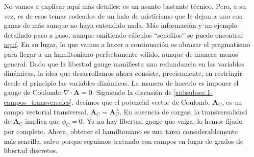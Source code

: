 No vamos a explicar aquí más detalles; es un asunto bastante técnico. Pero, a su vez, es de esos temas rodeados de un halo de misticismo que le dejan a uno con ganas de más aunque no haya entendido nada. Más información y un ejemplo detallado paso a paso, aunque omitiendo cálculos ``sencillos'' se puede encontrar \href{https://arxiv.org/abs/2201.06558}{aquí}. En su lugar, lo que vamos a hacer a continuación es abrazar el pragmatismo para llegar a un hamiltoniano perfectamente válido, aunque de manera menos general. Dado que la libertad gauge manifiesta una redundancia en las variables dinámicas, la idea que desarrollamos ahora consiste, precisamente, en restringir desde el principio las variables dinámicas. La manera de hacerlo es imponer el gauge de Coulomb: \(\nabla\cdot\mathbf{A} = 0\). Siguiendo la discusión de \cref{subsubsec.1-campos_transversales}, decimos que el potencial vector de Coulomb, \(\mathbf{A}_\mathrm{C}\), es un campo vectorial transversal, \(\mathbf{A}_\mathrm{C} = \mathbf{A}_\mathrm{C}^\perp\). En ausencia de cargas, la transversalidad de \(\mathbf{A}_\mathrm{C}\) implica que \(\phi_\mathrm{C} = 0\). Ya no hay libertad gauge que valga, lo hemos fijado por completo. Ahora, obtener el hamiltoniano es una tarea considerablemente más sencilla, salvo porque seguimos tratando con campos en lugar de grados de libertad discretos. 

